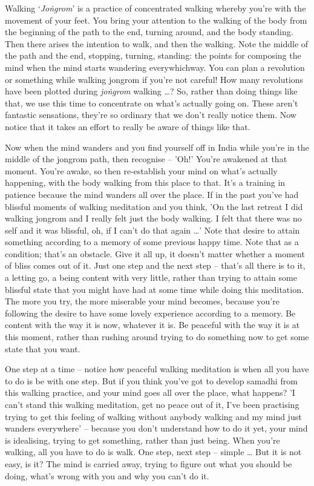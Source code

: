 
Walking `\textit{Jo\.ngrom}' is a practice of concentrated walking whereby you're with the movement of your feet. You bring your attention to the walking of the body from the beginning of the path to the end, turning around, and the body standing. Then there arises the intention to walk, and then the walking. Note the middle of the path and the end, stopping, turning, standing: the points for composing the mind when the mind starts wandering everywhichway. You can plan a revolution or something while walking jongrom if you're not careful! How many revolutions have been plotted during \textit{jo\.ngrom} walking \ldots{}? So, rather than doing things like that, we use this time to concentrate on what's actually going on. These aren't fantastic sensations, they're so ordinary that we don't really notice them. Now notice that it takes an effort to really be aware of things like that.

Now when the mind wanders and you find yourself off in India while you're in the middle of the jongrom path, then recognise -- 'Oh!' You're awakened at that moment. You're awake, so then re-establish your mind on what's actually happening, with the body walking from this place to that. It's a training in patience because the mind wanders all over the place. If in the past you've had blissful moments of walking meditation and you think, 'On the last retreat I did walking jongrom and I really felt just the body walking. I felt that there was no self and it was blissful, oh, if I can't do that again \ldots{}' Note that desire to attain something according to a memory of some previous happy time. Note that as a condition; that's an obstacle. Give it all up, it doesn't matter whether a moment of bliss comes out of it. Just one step and the next step -- that's all there is to it, a letting go, a being content with very little, rather than trying to attain some blissful state that you might have had at some time while doing this meditation. The more you try, the more miserable your mind becomes, because you're following the desire to have some lovely experience according to a memory. Be content with the way it is now, whatever it is. Be peaceful with the way it is at this moment, rather than rushing around trying to do something now to get some state that you want.

One step at a time -- notice how peaceful walking meditation is when all you have to do is be with one step. But if you think you've got to develop samadhi from this walking practice, and your mind goes all over the place, what happens? 'I can't stand this walking meditation, get no peace out of it, I've been practising trying to get this feeling of walking without anybody walking and my mind just wanders everywhere' -- because you don't understand how to do it yet, your mind is idealising, trying to get something, rather than just being. When you're walking, all you have to do is walk. One step, next step -- simple \ldots{} But it is not easy, is it? The mind is carried away, trying to figure out what you should be doing, what's wrong with you and why you can't do it.

